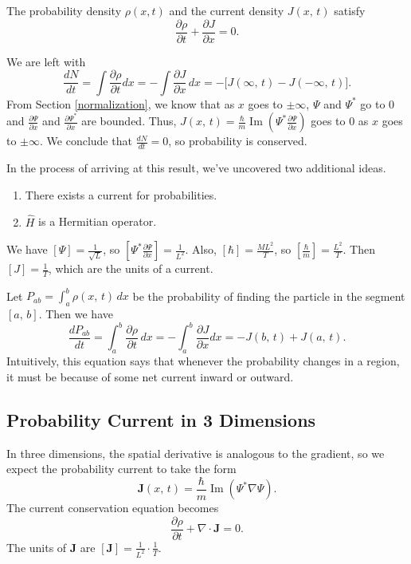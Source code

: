 \begin{framedthm}\label{current_conservation_thm}
    The probability density $\rho(x,t)$ and the current density $J(x,\,t)$  satisfy $$\frac{\partial\rho}{\partial t}+\frac{\partial J}{\partial x}=0.$$
\end{framedthm}

We are left with $$\frac{dN}{dt}=\int\frac{\partial\rho}{\partial t}dx=-\int\frac{\partial J}{\partial x}\,dx=-\bigg[J(\infty,\,t)-J(-\infty,\,t)\bigg].$$From Section \ref{normalization}, we know that as $x$ goes to $\pm\infty$, $\Psi$ and $\Psi^*$ go to $0$ and $\frac{\partial\Psi}{\partial x}$ and $\frac{\partial\Psi^*}{\partial x}$ are bounded. Thus, $J(x,\,t)=\frac{\hbar}{m}\operatorname{Im}(\Psi^*\frac{\partial\Psi}{\partial x})$ goes to $0$ as $x$ goes to $\pm\infty$. We conclude that $\frac{dN}{dt}=0$, so probability is conserved. 

\begin{framedrmk*}
    In the process of arriving at this result, we've uncovered two additional ideas.
    \begin{enumerate}
        \item There exists a current for probabilities.
        \item $\hat{H}$ is a Hermitian operator.
    \end{enumerate}
\end{framedrmk*}

\begin{framedrmk*}[Units of $J(x,t)$]
    We have $[\Psi]=\frac{1}{\sqrt{L}}$, so $[\Psi^*\frac{\partial\Psi}{\partial x}]=\frac{1}{L^2}$. Also, $[\hbar]=\frac{ML^2}{T}$, so $[\frac{\hbar}{m}]=\frac{L^2}{T}$. Then $[J]=\frac{1}{T}$, which are the units of a current.
\end{framedrmk*}

Let $P_{ab}=\int_a^b\rho(x,\,t)\,dx$ be the probability of finding the particle in the segment $[a,\,b]$. Then we have $$\frac{dP_{ab}}{dt}=\int_a^b\frac{\partial\rho}{\partial t}\,dx=-\int_a^b\frac{\partial J}{\partial x}dx=-J(b,\,t)+J(a,\,t).$$Intuitively, this equation says that whenever the probability changes in a region, it must be because of some net current inward or outward.

\subsection{Probability Current in 3 Dimensions}\label{3-d_current}

In three dimensions, the spatial derivative is analogous to the gradient, so we expect the probability current to take the form $$\mathbf{J}(x,\,t)=\frac{\hbar}{m}\operatorname{Im}(\Psi^*\nabla\Psi).$$The current conservation equation becomes $$\frac{\partial\rho}{\partial t}+\nabla\cdot\mathbf{J}=0.$$The units of $\mathbf{J}$ are $[\mathbf{J}]=\frac{1}{L^2}\cdot\frac{1}{T}$.

